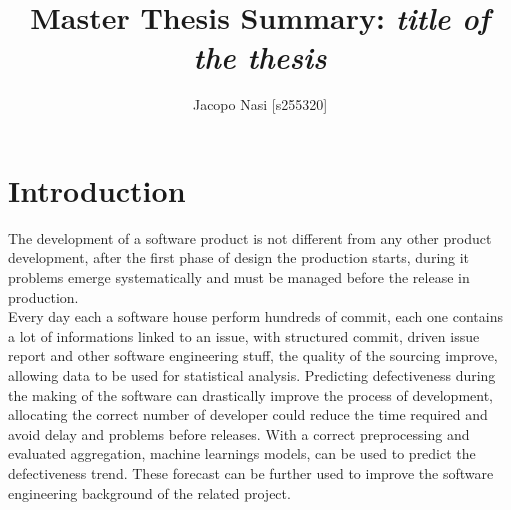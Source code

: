 \documentclass{article}
\begin{document}
\title{Master Thesis Summary: \textit{title of the thesis}}

\author{Jacopo Nasi [s255320]}

\maketitle

\section{Introduction}
The development of a software product is not different from any other product development, after the first phase of design the production starts, during it problems emerge systematically and must be managed before the release in production.\\
Every day each a software house perform hundreds of commit, each one contains a lot of informations linked to an issue, with structured commit, driven issue report and other software engineering stuff, the quality of the sourcing improve, allowing data to be used for statistical analysis. Predicting defectiveness during the making of the software can drastically improve the process of development, allocating the correct number of developer could reduce the time required and avoid delay and problems before releases.
With a correct preprocessing and evaluated aggregation, machine learnings models, can be used to predict the defectiveness trend. These forecast can be further used to improve the software engineering background of the related project.
\end{document}
